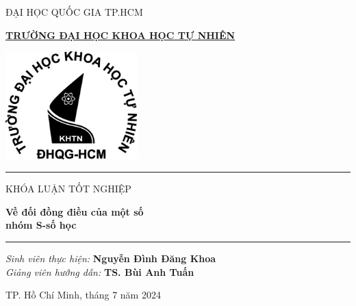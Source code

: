 
\thispagestyle{empty}

\begin{center}
    \vspace{-1cm}
    \centerline{ĐẠI HỌC QUỐC GIA TP.HCM}
    \centerline{\bf\underline{TRƯỜNG ĐẠI HỌC KHOA HỌC TỰ NHIÊN}}
    \vspace{2cm}

    \includegraphics[width=2in]{./assets/hcmus-logo-black.png}

    \vspace{1cm}

    \noindent\rule{15cm}{1pt}
    \vspace{0.4cm}

    {\Large{KHÓA LUẬN TỐT NGHIỆP}}

    \vspace{0.1cm}

    {\huge\textbf{Về đối đồng điều của một số\\nhóm S-số học}}

    \noindent\rule{15cm}{1pt}

    \vspace{3cm}
    {\large\textit{Sinh viên thực hiện: }}
    {\large\textbf{Nguyễn Đình Đăng Khoa}}\\

    \vspace{0.1cm}
    {\large\textit{Giảng viên hướng dẫn: }}
    {\large\textbf{TS. Bùi Anh Tuấn}}

    \vspace{\fill}
    TP. Hồ Chí Minh, tháng 7 năm 2024
\end{center}